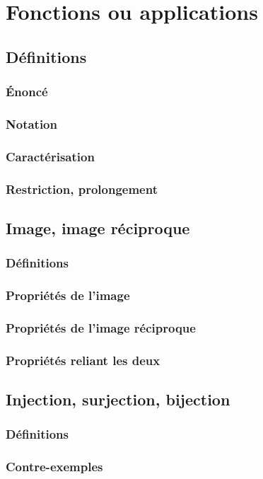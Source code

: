 \documentclass[12pt,a4paper,french]{book}
\begin{document}
	\section{Fonctions ou applications}
		\subsection{Définitions}
			\subsubsection{Énoncé}
			\subsubsection{Notation}
			\subsubsection{Caractérisation}
			\subsubsection{Restriction, prolongement}
		\subsection{Image, image réciproque}
			\subsubsection{Définitions}
			\subsubsection{Propriétés de l'image}
			\subsubsection{Propriétés de l'image réciproque}
			\subsubsection{Propriétés reliant les deux}
		\subsection{Injection, surjection, bijection}
			\subsubsection{Définitions}
			\subsubsection{Contre-exemples}
\end{document}
